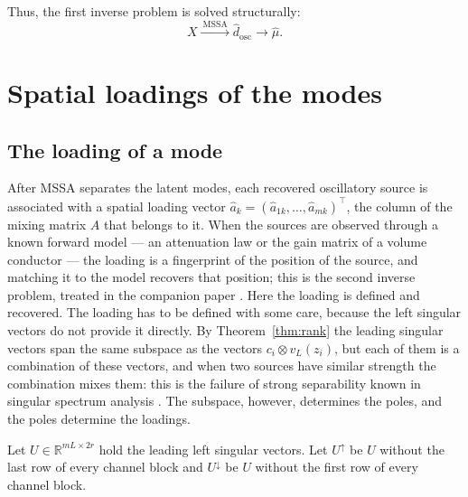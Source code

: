 \documentclass{article}
\begin{document}
Thus, the first inverse problem is solved structurally: \[
X \xrightarrow{\ \mathrm{MSSA}\ } \widehat{d}_{\mathrm{osc}} \longrightarrow \widehat{\mu}.
\]


\section{Spatial loadings of the modes}\label{sec:loadings}

\subsection{The loading of a mode}\label{sec:mssa-spatial-loading-as}

After MSSA separates the latent modes, each recovered oscillatory source is associated with a spatial loading vector $\widehat{a}_k = (\widehat{a}_{1k}, \dots, \widehat{a}_{mk})^{\top}$, the column of the mixing matrix $A$ that belongs to it. When the sources are observed through a known forward model --- an attenuation law or the gain matrix of a volume conductor --- the loading is a fingerprint of the position of the source, and matching it to the model recovers that position; this is the second inverse problem, treated in the companion paper \cite{ref-companion}. Here the loading is defined and recovered.
The loading has to be defined with some care, because the left singular vectors do not provide it directly. By Theorem~\ref{thm:rank} the leading singular vectors span the same subspace as the vectors $c_i \otimes v_L(z_i)$, but each of them is a combination of these vectors, and when two sources have similar strength the combination mixes them: this is the failure of strong separability known in singular spectrum analysis \cite{ref-Golyandina04}. The subspace, however, determines the poles, and the poles determine the loadings.

Let $U \in \mathbb{R}^{mL \times 2r}$ hold the leading left singular vectors. Let $U^{\uparrow}$ be $U$ without the last row of every channel block and $U^{\downarrow}$ be $U$ without the first row of every channel block.
\end{document}
